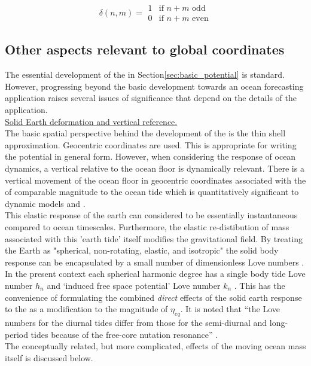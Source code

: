 \begin{equation}
\delta(n,m)  =     \begin{array}{ll}
                    1 & \mbox{if $n+m$ odd}  \\
                    0 & \mbox{if $n+m$ even} 
                    \end{array}             
\end{equation}


\subsection{Other aspects relevant to global coordinates}
\label{S:ATGP_extras}
The essential development of the \ATGP{} in Section\ref{sec:basic_potential} is standard.  However, progressing beyond the basic development towards an ocean forecasting application raises several issues of significance that depend on the details of the application.\\


\underline{Solid Earth deformation and vertical reference.}  \\
The basic spatial perspective behind the development of the \ATGP{} is the thin shell approximation.  Geocentric coordinates are used.  This is appropriate for writing the potential in general form.  However, when considering the response of ocean dynamics, a vertical relative to the ocean floor is dynamically relevant.  There is a vertical movement of the ocean floor in geocentric coordinates associated with the \ATGP{} of comparable magnitude to the ocean tide which is quantitatively significant to dynamic models \citep{Hendershott:1981ub} and \citep[pp.336]{gill1982atmosphere}.\\
This elastic response of the earth can considered to be essentially instantaneous compared to ocean timescales.  Furthermore, the elastic re-distibution of mass associated with this 'earth tide' itself modifies the gravitational field.    By treating the Earth as "spherical, non-rotating, elastic, and isotropic" the solid body response can be encapsulated by a small number of dimensionless Love numbers \citep{Agnew:2011ub}.  In the present context each spherical harmonic degree has a single body tide Love number $h_n$ and `induced free space potential' Love number $k_n$ \citep[Sec 5.3.3]{Urban:2013vl}. This has the convenience of formulating the combined \emph{direct} effects of the solid earth response to the \ATGP{} as a modification to the magnitude of $\eta_{eq}$.  It is noted that ``the Love numbers for the diurnal tides differ from those for the semi-diurnal and long-period tides because of the free-core nutation resonance'' \citep{Arbic:2004wz}.\\
The conceptually related, but more complicated, effects of the moving ocean mass itself is discussed below.

